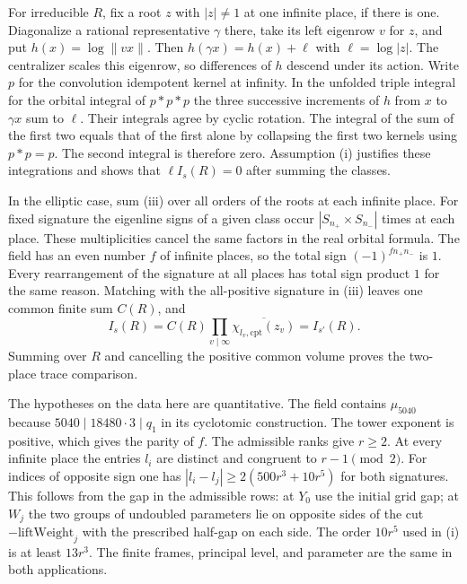 For irreducible $R$, fix a root $z$ with $|z|\ne1$ at one infinite
place, if there is one. Diagonalize a rational representative $\gamma$
there, take its left eigenrow $v$ for $z$, and put
$h(x)=\log\|vx\|$. Then $h(\gamma x)=h(x)+\ell$ with
$\ell=\log|z|$. The centralizer scales this eigenrow, so differences
of $h$ descend under its action. Write $p$ for the convolution
idempotent kernel at infinity. In the unfolded triple integral for the
orbital integral of $p*p*p$ the three successive increments of $h$ from
$x$ to $\gamma x$ sum to $\ell$. Their integrals agree by cyclic
rotation. The integral of the sum of the first two equals that of the
first alone by collapsing the first two kernels using $p*p=p$.
The second integral is therefore zero. Assumption (i) justifies these
integrations and shows that $\ell I_s(R)=0$ after summing the classes.

In the elliptic case, sum (iii) over all orders of the roots at each
infinite place. For fixed signature the eigenline signs of a given
class occur $|S_{n_+}\times S_{n_-}|$ times at each place.
These multiplicities cancel the same factors in the real orbital formula.
The field has an even number $f$ of infinite places, so the total sign
$(-1)^{fn_+n_-}$ is $1$. Every rearrangement of the signature at all
places has total sign product $1$ for the same reason. Matching with
the all-positive signature in (iii) leaves one common finite sum
$C(R)$, and
\[
 I_s(R)=C(R)\prod_{v\mid\infty}\overline{\chi_{l_v,\mathrm{cpt}}(z_v)}
       =I_{s'}(R).
\]
Summing over $R$ and cancelling the positive common volume proves the
two-place trace comparison.

The hypotheses on the data here are quantitative. The field contains
$\mu_{5040}$ because $5040\mid18480\cdot3\mid q_1$ in its cyclotomic
construction. The tower exponent is positive, which gives the parity of
$f$. The admissible ranks give $r\ge2$. At every infinite place the
entries $l_i$ are distinct and congruent to $r-1\pmod2$. For indices of
opposite sign one has
$|l_i-l_j|\ge2(500r^3+10r^5)$ for both signatures. This follows from
the gap in the admissible rows: at $Y_0$ use the initial grid gap; at
$W_j$ the two groups of undoubled parameters lie on opposite sides of
the cut $-\mathrm{liftWeight}_j$ with the prescribed half-gap on each
side. The order $10r^5$ used in (i) is at least $13r^3$. The finite
frames, principal level, and parameter are the same in both applications.

